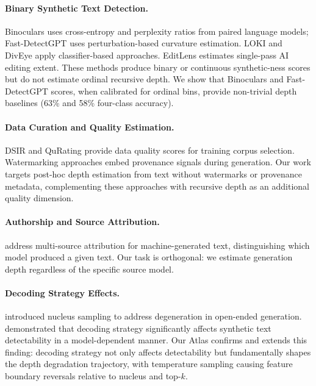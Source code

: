 \documentclass[11pt,a4paper]{article}
\begin{document}
\paragraph{Binary Synthetic Text Detection.}
Binoculars \citep{hans2024binoculars} uses cross-entropy and perplexity ratios from paired language models; Fast-DetectGPT \citep{bao2024fastdetectgpt} uses perturbation-based curvature estimation. LOKI \citep{loki2024} and DivEye apply classifier-based approaches. EditLens estimates single-pass AI editing extent. These methods produce binary or continuous synthetic-ness scores but do not estimate ordinal recursive depth. We show that Binoculars and Fast-DetectGPT scores, when calibrated for ordinal bins, provide non-trivial depth baselines (63\% and 58\% four-class accuracy).

\paragraph{Data Curation and Quality Estimation.}
DSIR \citep{xie2023dsir} and QuRating \citep{wettig2024qurating} provide data quality scores for training corpus selection. Watermarking approaches \citep{kirchenbauer2023watermark} embed provenance signals during generation. Our work targets post-hoc depth estimation from text without watermarks or provenance metadata, complementing these approaches with recursive depth as an additional quality dimension.

\paragraph{Authorship and Source Attribution.}
\citet{uchendu2020authorship} address multi-source attribution for machine-generated text, distinguishing which model produced a given text. Our task is orthogonal: we estimate generation depth regardless of the specific source model.

\paragraph{Decoding Strategy Effects.}
\citet{holtzman2020curious} introduced nucleus sampling to address degeneration in open-ended generation. \citet{garces2025coling} demonstrated that decoding strategy significantly affects synthetic text detectability in a model-dependent manner. Our Atlas confirms and extends this finding: decoding strategy not only affects detectability but fundamentally shapes the depth degradation trajectory, with temperature sampling causing feature boundary reversals relative to nucleus and top-$k$.
\end{document}
